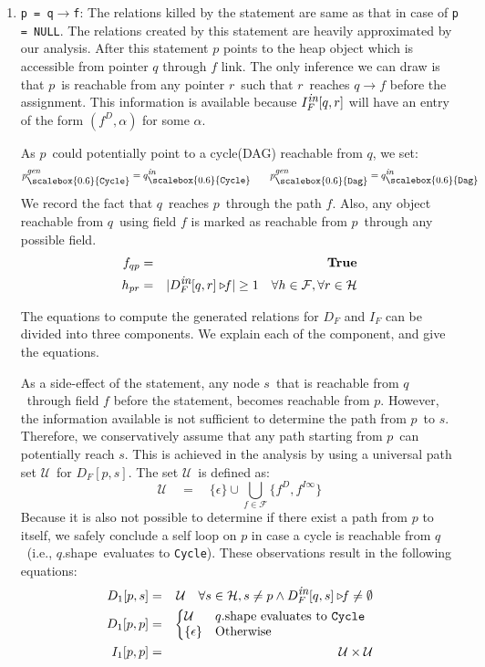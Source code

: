 \documentclass{sig-alternate}
\newcommand{\p}{\ensuremath{p}}
\newcommand{\q}{\ensuremath{q}}
\newcommand{\s}{\ensuremath{s}}
\newcommand{\myr}{\ensuremath{r}}
\newcommand{\drct}{\ensuremath{D}}
\newcommand{\indrct}{\ensuremath{I}}
\newcommand{\heap}{\ensuremath{\mathcal{H}}}
\newcommand{\fields}{\ensuremath{\mathcal{F}}}
\newcommand{\upath}{\ensuremath{\mathcal{U}}}
\newcommand{\shape}{\mbox{shape}}
\newcommand{\subC}{\mbox{\scalebox{0.6}{\Cycle}}}
\newcommand{\subD}{\mbox{\scalebox{0.6}{\Dag}}}
\newcommand{\epsilonset}{\ensuremath{\{\epsilon\}}}
\newcommand{\din}{\mbox{\footnotesize\em in}}
\newcommand{\dgen}{\mbox{\footnotesize\em gen}}
\newcommand{\GenC}[1]{\ensuremath{{#1}_{\subC}^{\dgen}}}
\newcommand{\GenD}[1]{\ensuremath{{#1}_{\subD}^{\dgen}}}
\newcommand{\InC}[1]{\ensuremath{{#1}_{\subC}^{\din}}}
\newcommand{\InD}[1]{\ensuremath{{#1}_{\subD}^{\din}}}
\newcommand{\project}[2]{\ensuremath{#1\triangleright\!\!#2}}
\newcommand{\num}[1]{\ensuremath{|#1|}}
\newcommand{\Dag}{{\tt Dag}}
\newcommand{\Cycle}{{\tt Cycle}}
\newcommand{\true}{\textbf{True}}
\begin{document}
\begin{enumerate}
\item {\tt p = q$\rightarrow$f}: The relations killed by the
  statement are same as that in case of {\tt p = NULL}. The
  relations created by this statement are heavily
  approximated by our analysis.  After this statement $\p$
  points to the heap object which is accessible from pointer
  $\q$ through $f$ link. The only inference we can draw is
  that \p\ is reachable from any pointer \myr\ such that
  \myr\ reaches $\q\rightarrow f$ before the assignment. This
  information is available because $I_F^{\din}[\q, \myr]$
  will have an entry of the form $(f^\drct, \alpha)$ for some
  $\alpha$. 

  As \p\ could potentially point to a cycle(DAG) reachable
  from \q, we set:
  $$\GenC{p} = \InC{q} \qquad \GenD{p} = \InD{q}$$ We record
  the fact that \q\ reaches \p\ through the path
  $f$. Also, any object reachable from \q\ using field $f$
  is marked as reachable from \p\ through any
  possible field.
\begin{eqnarray*}
  f_{\q\p} &=& \true \\ %
  {h_{\p\myr}} &=&
  \num{\project{D_F^{\din}[\q,\myr]}{f}} \geq 1\quad
  \forall h \in \fields, \forall \myr \in \heap 
\end{eqnarray*}

The equations to compute the generated relations for  $D_F$ and $I_F$
can be divided into three components. We explain each of the
component, and give the equations.

As a side-effect of the statement, any node \s\ that is
reachable from \q\ through field $f$ before the statement,
becomes reachable from \p. However, the information available
is not sufficient to determine the path from \p\ to
\s. Therefore, we conservatively assume that any path
starting from \p\ can potentially reach \s. This is achieved
in the analysis by using a universal path set \upath\ for
$D_F[\p,\s]$. The set \upath\ is defined as:
\[ \upath \quad=\quad \epsilonset \cup \bigcup_{f\in\fields} \{f^{\drct},
f^{\indrct\infty}\} \] Because it is also not possible to determine
if there exist a path from $\p$ to itself,  we safely
conclude a self loop on $p$ in case a cycle is reachable
from \q\ (i.e., \q.\shape\ evaluates to \Cycle). 
These
observations result in the following equations:
\begin{eqnarray*}
  D_1[\p, \s] &=&  \upath \quad
  \forall \s \in \heap, \s \not=\p \wedge
  \project{D_F^{\din}[\q, \s]}{f} \not= \emptyset
  \\
  D_1[\p, \p] &=& \left\{\begin{array}{@{}ll}
    \upath& \q.\shape \mbox{ evaluates to } \Cycle \\
    \epsilonset & \mbox{Otherwise}
  \end{array}\right.  \\
  I_1[\p, \p] &=& \upath \times \upath  
\end{eqnarray*}


\end{enumerate}
\end{document}
